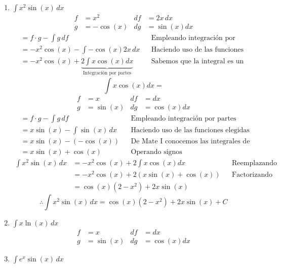 \documentclass[letterpaper]{article}
\renewcommand{\*}{\cdot}
\theoremstyle{definition}
\begin{document}
\begin{enumerate}
\begin{enumerate}
	\item$\displaystyle \int x^2 \sin(x) \, dx$
	\begin{align*}
		f &= x^2 & df &=2x\,dx \\
		g &= -\cos(x) & dg &= \sin(x)dx
	\end{align*}
	\begin{align*}
		&= f \* g - \int g\,df &&\text{Empleando integración por partes}\\
		&= -x^2\cos(x) - \int -\cos(x)2x\,dx &&\text{Haciendo uso de las funciones elegidas}\\
		&= -x^2\cos(x) + \underbrace{2\int x\cos(x)dx}_\text{Integración por partes} &&\text{Sabemos que la integral es un operador lineal}
	\end{align*}
	\[ \int x\cos(x)dx = \]
	\begin{align*}
		f &= x & df &=dx \\
		g &= \sin(x) & dg &= \cos(x)dx
	\end{align*}
	\begin{align*}
		&= f \* g - \int g\,df &&\text{Empleando integración por partes}\\
		&= x\sin(x) - \int \sin(x)\,dx &&\text{Haciendo uso de las funciones elegidas}\\
		&= x\sin(x) - (-\cos(x)) &&\text{De Mate I conocemos las integrales de las f. trigonométricas}\\
		&= x\sin(x) + \cos(x) &&\text{Operando signos}
	\end{align*}
	\begin{align*}
		\int x^2 \sin(x) \, dx &= -x^2\cos(x) + 2\int x\cos(x)dx &&\text{Reemplazando en el resultado anterior}\\
		&= -x^2\cos(x) + 2(x\sin(x) + \cos(x)) &&\text{Factorizando }\\
		&= \cos(x)(2 -x^2) +2x\sin(x) &&\text{ }
	\end{align*}
	\[ \therefore 	\int x^2 \sin(x) \, dx = \cos(x)(2 -x^2) +2x\sin(x)  +C \]
	 \newpage
	\item$\displaystyle \int x \ln(x) \, dx$
	\begin{align*}
		f &= x & df &=dx \\
		g &= \sin(x) & dg &= \cos(x)dx
	\end{align*}
	\item$\displaystyle \int e^{x} \sin(x) \, dx$
\end{enumerate}


\end{enumerate}
\end{document}
